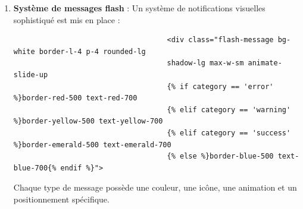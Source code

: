 \documentclass[a4paper,11pt]{article}
\begin{document}
\begin{enumerate}
                        \item \textbf{Système de messages flash} :
                            \noindent Un système de notifications visuelles sophistiqué est mis en place :
                            \begin{tcolorbox}[colback=lightgray!6, colframe=black, left=-45mm, right=5mm, top=2mm, bottom=0mm, boxrule=0.1mm]
                                \begin{verbatim}
                                    <div class="flash-message bg-white border-l-4 p-4 rounded-lg 
                                    shadow-lg max-w-sm animate-slide-up
                                    {% if category == 'error' %}border-red-500 text-red-700
                                    {% elif category == 'warning' %}border-yellow-500 text-yellow-700
                                    {% elif category == 'success' %}border-emerald-500 text-emerald-700
                                    {% else %}border-blue-500 text-blue-700{% endif %}">
                                \end{verbatim}
                            \end{tcolorbox}

                            \noindent Chaque type de message possède une couleur, une icône, une animation et un positionnement spécifique.


\end{enumerate}
\end{document}
